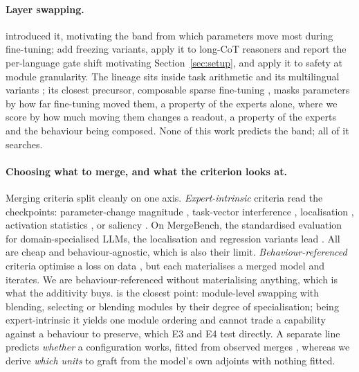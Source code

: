 \documentclass[10pt]{article}
\theoremstyle{plain}
\theoremstyle{definition}
\theoremstyle{remark}
\begin{document}
\paragraph{Layer swapping.}
\citet{bandarkar2025layerswap} introduced it, motivating the band from which
parameters move most during fine-tuning; \citet{bandarkar2025unreasonable} add
freezing variants, \citet{lasbordes2026rethinking} apply it to long-CoT reasoners
and report the per-language gate shift motivating Section~\ref{sec:setup}, and
\citet{shin2026safetyswap} apply it to safety at module granularity. The lineage sits inside
task arithmetic \citep{ilharco2023task} and its multilingual variants
\citep{chronopoulou2024langtask}; its closest precursor, composable sparse
fine-tuning \citep{ansell2022sft}, masks parameters by how far fine-tuning moved
them, a property of the experts alone, where we score by how much moving them
changes a readout, a property of the experts and the behaviour being composed.
None of this work predicts the band; all of it searches.

\paragraph{Choosing what to merge, and what the criterion looks at.}
Merging criteria split cleanly on one axis. \emph{Expert-intrinsic} criteria read the checkpoints: parameter-change
magnitude \citep{bandarkar2025layerswap, ansell2022sft, shin2026safetyswap},
task-vector interference \citep{yadav2023ties, yu2024dare}, localisation
\citep{he2024localize}, activation statistics \citep{acm2025, jin2023regmean},
or saliency \citep{park2026samerging}. On MergeBench, the standardised evaluation for domain-specialised LLMs, the localisation and regression variants lead \citep{he2025mergebench}. All are cheap and
behaviour-agnostic, which is also their limit. \emph{Behaviour-referenced} criteria optimise a loss on data
\citep{yang2024adamerging, supermerge2024, expertmerging2025, lotmerging2025,
symerge2026, outputspace2026}, but each materialises a merged model and
iterates. We are behaviour-referenced without materialising anything, which is what the
additivity buys. \citet{shin2026safetyswap} is the closest point: module-level
swapping with blending, selecting or blending modules by their degree of
specialisation; being expert-intrinsic it yields one module ordering and cannot trade a
capability against a behaviour to preserve, which E3 and E4 test directly. A separate line predicts \emph{whether} a configuration works, fitted from
observed merges \citep{zhou2026mergeability, simmerge2026}, whereas we derive
\emph{which units} to graft from the model's own adjoints with nothing fitted.
\end{document}
